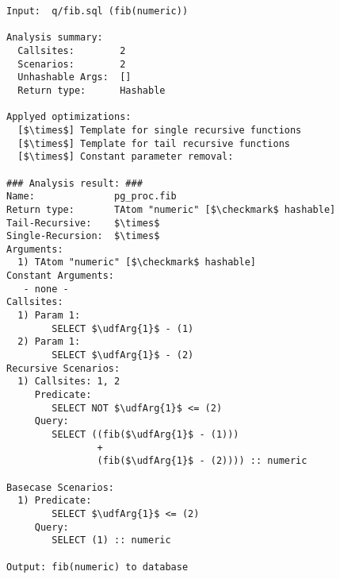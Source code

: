 \footnotesize
\begin{lstlisting}[language={}]
Input:	q/fib.sql (fib(numeric))

Analysis summary:
  Callsites:		2
  Scenarios:		2
  Unhashable Args:	[]
  Return type:		Hashable

Applyed optimizations:
  [$\times$] Template for single recursive functions
  [$\times$] Template for tail recursive functions
  [$\times$] Constant parameter removal: 

### Analysis result: ###
Name:              pg_proc.fib
Return type:       TAtom "numeric" [$\checkmark$ hashable]
Tail-Recursive:    $\times$
Single-Recursion:  $\times$
Arguments:
  1) TAtom "numeric" [$\checkmark$ hashable]
Constant Arguments:
   - none -
Callsites:
  1) Param 1:
        SELECT $\udfArg{1}$ - (1) 
  2) Param 1:
        SELECT $\udfArg{1}$ - (2) 
Recursive Scenarios:
  1) Callsites: 1, 2
     Predicate:
        SELECT NOT $\udfArg{1}$ <= (2) 
     Query:
        SELECT ((fib($\udfArg{1}$ - (1)))
                +
                (fib($\udfArg{1}$ - (2)))) :: numeric

Basecase Scenarios:
  1) Predicate:
        SELECT $\udfArg{1}$ <= (2) 
     Query:
        SELECT (1) :: numeric 
        
Output:	fib(numeric) to database
\end{lstlisting}